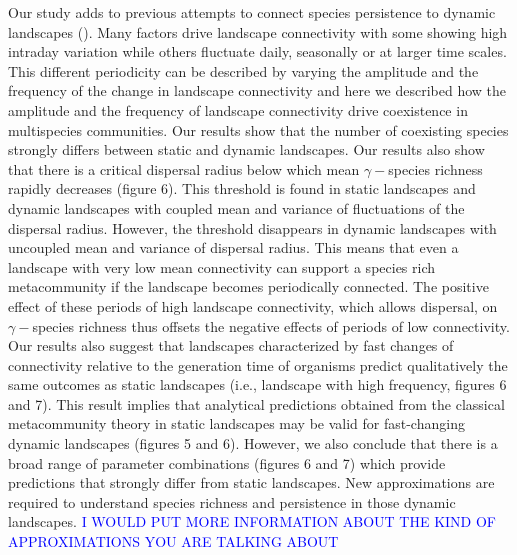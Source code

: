 \documentclass[12pt]{article}
\newcommand{\GM}[1]{\textcolor{Blue}{#1}}
\begin{document}
Our study adds to previous attempts to connect species persistence to dynamic landscapes (\cite{Hanski1999,keymeretal2000}). Many factors drive landscape connectivity with some showing high intraday variation while others fluctuate daily, seasonally or at larger time scales. This different periodicity can be described by varying the amplitude and the frequency of the change in landscape connectivity and here we described how the amplitude and the frequency of landscape connectivity drive coexistence in multispecies communities. Our results show that the number of coexisting species strongly differs between static and dynamic landscapes. Our results also show that there is a critical dispersal radius below which mean $\gamma-$species richness rapidly decreases (figure 6). This threshold is found in static landscapes and dynamic landscapes with coupled mean and variance of fluctuations of the dispersal radius. However, the threshold disappears in dynamic landscapes with uncoupled mean and variance of dispersal radius. This means that even a landscape with very low mean connectivity can support a species rich metacommunity if the landscape becomes periodically connected. The positive effect of these periods of high landscape connectivity, which allows dispersal, on $\gamma-$species richness thus offsets the negative effects of periods of low connectivity. Our results also suggest that landscapes characterized by fast changes of connectivity relative to the generation time of organisms predict qualitatively the same outcomes as static landscapes (i.e., landscape with high frequency, figures 6 and 7). This result implies that analytical predictions obtained from the classical metacommunity theory in static landscapes may be valid for fast-changing dynamic landscapes (figures 5 and 6). However, we also conclude that there is a broad range of parameter combinations (figures 6 and 7) which provide predictions that strongly differ from static landscapes. New approximations are required to understand species richness and persistence in those dynamic landscapes. \GM{I WOULD PUT MORE INFORMATION ABOUT THE KIND OF APPROXIMATIONS YOU ARE TALKING ABOUT}
\end{document}
